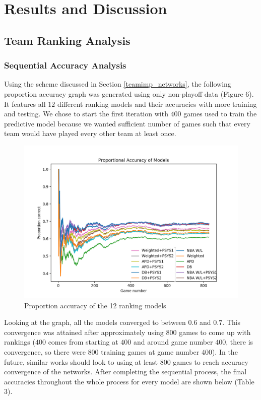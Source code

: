 \documentclass[12pt]{article}%
\begin{document}
\section{Results and Discussion}
\label{rnd}
\subsection{Team Ranking Analysis}
\subsubsection{Sequential Accuracy Analysis}
\null\quad\quad Using the scheme discussed in Section \ref{teamimp_networks}, the following proportion accuracy graph was generated using only non-playoff data (Figure 6). It features all $12$ different ranking models and their accuracies with more training and testing. We chose to start the first iteration with $400$ games used to train the predictive model because we wanted sufficient number of games such that every team would have played every other team at least once.
\begin{figure}[H]
  \centering
  \includegraphics[width=6in]{./images/prop_acc.png}
  \caption[Proportion accuracy of the 12 ranking models]{Proportion accuracy of the 12 ranking models}
\end{figure}
Looking at the graph, all the models converged to between $0.6$ and $0.7$. This convergence was attained after approximately using $800$ games to come up with rankings ($400$ comes from starting at $400$ and around game number $400$, there is convergence, so there were $800$ training games at game number $400$). In the future, similar works should look to using at least $800$ games to reach accuracy convergence of the networks. After completing the sequential process, the final accuracies throughout the whole process for every model are shown below (Table 3).
\end{document}
